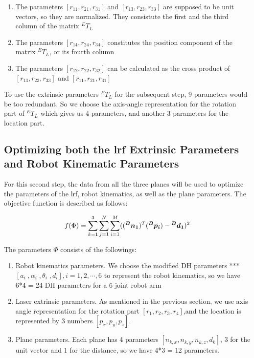 \begin{enumerate}
\item The parameters $[r_{11}, r_{21}, r_{31}]$ and $[r_{13}, r_{23}, r_{33}]$ are supposed to be unit vectors, so they are normalized. They consistute the first and the third column of the matrix ${^E}T_L$
\item The parameters $[r_{14}, r_{24}, r_{34}]$ constitutes the position component of the matrix ${^E}T_L$, or its fourth column
\item The parameters $[r_{12}, r_{22}, r_{32}]$ can be calculated as the cross product of  $[r_{13}, r_{23}, r_{33}]$ and $[r_{11}, r_{21}, r_{31}]$ 
\end{enumerate}

To use the extrinsic parameters ${^E}T_L$ for the subsequent step, 9 parameters would be too redundant. So we choose the axis-angle representation for the rotation part of ${^E}T_L$ which gives us 4 parameters, and another 3 parameters for the location part. 


\subsection{Optimizing both the \ac{lrf} Extrinsic Parameters and Robot Kinematic Parameters}
\label{sec:second_step}
For this second step, the data from all the three planes will be used to optimize the parameters of the \ac{lrf}, robot kinematics, as well as the plane parameters. The objective function is described as follows:

\begin{equation}
 f(\Phi) =  \sum_{k=1}^{3} \sum_{j=1}^{N} \sum_{i=1}^{M} ((\vb*{{^B}n_1}) ^T (\vb*{{^B}p_i}) - \vb*{{^B}d_1})^2
\end{equation}

The parameters $\Phi$ consists of the followings:
\begin{enumerate}
\item Robot kinematics parameters. We choose the modified DH parameters *** $[a_i \;, \alpha_i \;,\theta_i \;,d_i], i=1, 2, \cdots ,6$ to represent the robot kinematics, so we have 6*4 = 24 DH parameters for a 6-joint robot arm
\item Laser extrinsic parameters. As mentioned in the previous section, we use axis angle representation for the rotation part $[r_1, r_2, r_3, r_4]$,and the location is represented by 3 numbers $[p_x, p_y, p_z]$. 
\item Plane parameters. Each plane has 4 parameters $[n_{k,x}, n_{k,y}, n_{k,z}, d_{k}]$, 3 for the unit vector and 1 for the distance, so we have 4*3 = 12 parameters. 
\end{enumerate}


